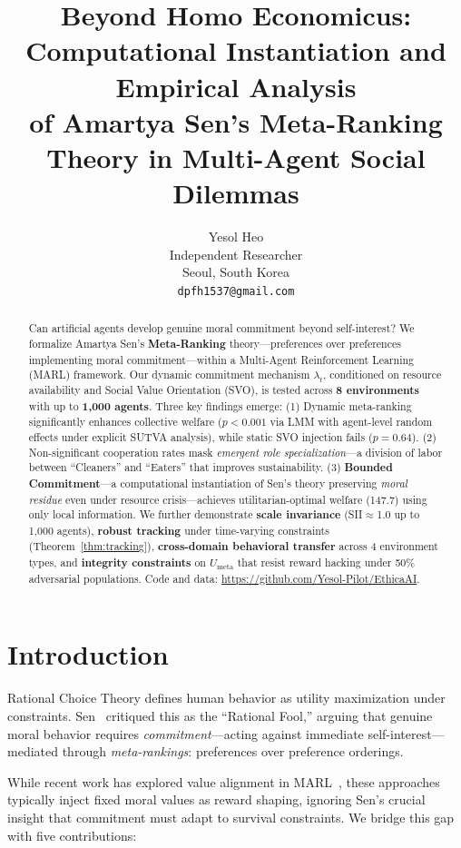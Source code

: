 \documentclass{article}
\title{Beyond Homo Economicus: Computational Instantiation and Empirical Analysis\\
of Amartya Sen's Meta-Ranking Theory in Multi-Agent Social Dilemmas}
\author{
  Yesol Heo \\
  Independent Researcher \\
  Seoul, South Korea \\
  \texttt{dpfh1537@gmail.com}
}
\begin{document}
\maketitle

\begin{abstract}
Can artificial agents develop genuine moral commitment beyond self-interest?
We formalize Amartya Sen's \textbf{Meta-Ranking} theory---preferences over preferences implementing moral commitment---within a Multi-Agent Reinforcement Learning (MARL) framework.
Our dynamic commitment mechanism $\lambda_t$, conditioned on resource availability and Social Value Orientation (SVO), is tested across \textbf{8 environments} with up to \textbf{1,000 agents}.
Three key findings emerge:
(1) Dynamic meta-ranking significantly enhances collective welfare ($p{<}0.001$ via LMM with agent-level random effects under explicit SUTVA analysis), while static SVO injection fails ($p{=}0.64$).
(2) Non-significant cooperation rates mask \emph{emergent role specialization}---a division of labor between ``Cleaners'' and ``Eaters'' that improves sustainability.
(3) \textbf{Bounded Commitment}---a computational instantiation of Sen's theory preserving \textit{moral residue} even under resource crisis---achieves utilitarian-optimal welfare (147.7) using only local information.
We further demonstrate \textbf{scale invariance} (SII$\approx$1.0 up to 1,000 agents), \textbf{robust tracking} under time-varying constraints (Theorem~\ref{thm:tracking}), \textbf{cross-domain behavioral transfer} across 4 environment types, and \textbf{integrity constraints} on $U_{\text{meta}}$ that resist reward hacking under 50\% adversarial populations.
Code and data: \url{https://github.com/Yesol-Pilot/EthicaAI}.
\end{abstract}

\section{Introduction}

Rational Choice Theory defines human behavior as utility maximization under constraints.
Sen~\cite{sen1977rational} critiqued this as the ``Rational Fool,'' arguing that genuine moral behavior requires \textit{commitment}---acting against immediate self-interest---mediated through \textit{meta-rankings}: preferences over preference orderings.

While recent work has explored value alignment in MARL~\cite{rodriguez2021multi,christoffersen2023get}, these approaches typically inject fixed moral values as reward shaping, ignoring Sen's crucial insight that commitment must adapt to survival constraints.
We bridge this gap with five contributions:
\end{document}
